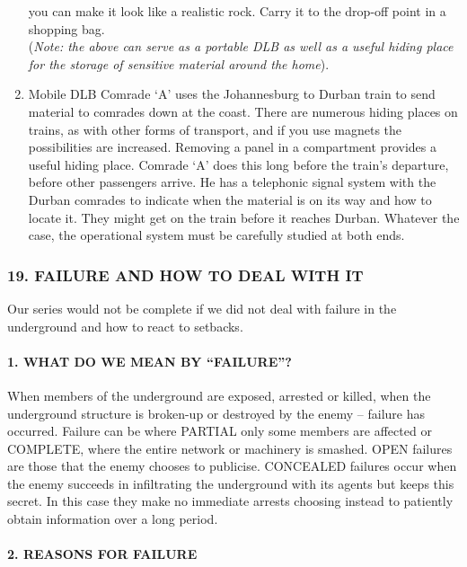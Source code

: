 \begin{enumerate}
  you can make it look like a realistic rock. Carry it to the drop-off
  point in a shopping bag.\\
   (\emph{Note: the above can serve as a portable DLB as well as a
  useful hiding place for the storage of sensitive material around the
  home}).
\item
  {Mobile DLB} Comrade `A' uses the Johannesburg to Durban train to send
  material to comrades down at the coast. There are numerous hiding
  places on trains, as with other forms of transport, and if you use
  magnets the possibilities are increased. Removing a panel in a
  compartment provides a useful hiding place. Comrade `A' does this long
  before the train's departure, before other passengers arrive. He has a
  telephonic signal system with the Durban comrades to indicate when the
  material is on its way and how to locate it. They might get on the
  train before it reaches Durban. Whatever the case, the operational
  system must be carefully studied at both ends.
\end{enumerate}

\subsubsection{19. FAILURE AND HOW TO DEAL WITH IT}

Our series would not be complete if we did not deal with failure in the
underground and how to react to setbacks.

\paragraph{\texorpdfstring{1. WHAT DO WE MEAN BY
``FAILURE''?}{1. WHAT DO WE MEAN BY FAILURE?}}

When members of the underground are exposed, arrested or killed, when
the underground structure is broken-up or destroyed by the enemy --
failure has occurred. Failure can be where PARTIAL only some members are
affected or COMPLETE, where the entire network or machinery is smashed.
OPEN failures are those that the enemy chooses to publicise. CONCEALED
failures occur when the enemy succeeds in infiltrating the underground
with its agents but keeps this secret. In this case they make no
immediate arrests choosing instead to patiently obtain information over
a long period.

\paragraph{2. REASONS FOR FAILURE}

